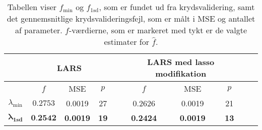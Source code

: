 \begin{table}
\center
\begin{tabular}{cccc | cccccc}
\toprule
 &  \multicolumn{3}{c}{LARS} &&  \multicolumn{3}{c}{LARS med lasso modifikation}  \\ \midrule
& $f$ & MSE & $p$ & & $f$ & MSE & $p$ \\
$\lambda_{\min}$ & $0.2753$ &  0.0019 &27 &&  0.2626 & 0.0019 & 21   \\
$\boldsymbol{\lambda}_{\textbf{1sd}}$ & $\textbf{0.2542} $ & \textbf{0.0019} & \textbf{19} &&  \textbf{0.2424} & \textbf{0.0019} & \textbf{13 } \\ \bottomrule
 \end{tabular}
\caption{Tabellen viser $f_{\min}$ og $f_{\text{1sd}}$, som er fundet ud fra krydsvalidering, samt det gennemsnitlige krydsvalideringsfejl, som er målt i MSE og antallet af parameter. 
$f$-værdierne, som er markeret med tykt er de valgte estimater for $\widehat{f}$.} \label{tab:lars_lasso_tab}
\end{table}
